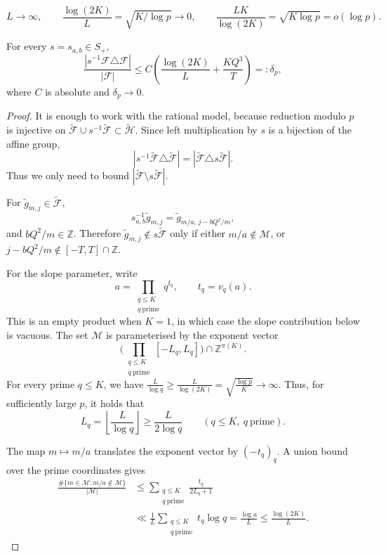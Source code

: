 \documentclass[10pt,a4paper]{amsart}
\newcommand{\Z}{\mathbb Z}
\begin{document}
\begin{equation}\label{eq:L-choice}
        L\to\infty,
        \qquad
        \frac{\log(2K)}{L}=\sqrt{K/\log p}\to0,
        \qquad
        \frac{LK}{\log(2K)}=\sqrt{K\log p}=o(\log p).
\end{equation}

\begin{lemma}\label{lem:Folner}
For every $s=s_{a,b}\in S_+$,
\[
        \frac{|s^{-1}\mathcal F\triangle\mathcal F|}{|\mathcal F|}
        \le C\left(\frac{\log(2K)}{L}+\frac{KQ^3}{T}\right)=: \delta_p,
\]
where $C$ is absolute and $\delta_p\to0$.
\end{lemma}

\begin{proof}
It is enough to work with the rational model, because reduction modulo $p$ is
injective on $\widetilde{\mathcal F}\cup s^{-1}\widetilde{\mathcal F}\subset
\widetilde{\mathcal H}$.  Since left multiplication by $s$ is a bijection of the
affine group,
\[
    |s^{-1}\widetilde{\mathcal F}\triangle\widetilde{\mathcal F}|
    =|\widetilde{\mathcal F}\triangle s\widetilde{\mathcal F}|.
\]
Thus we only need to bound $|\widetilde{\mathcal F}\setminus s\widetilde{\mathcal F}|$.

For $\widetilde g_{m,j}\in\widetilde{\mathcal F}$,
\[
    s_{a,b}^{-1}\widetilde g_{m,j}
    =\widetilde g_{m/a,\, j-bQ^2/m},
\]
and $bQ^2/m\in\Z$.  Therefore $\widetilde g_{m,j}\notin
s\widetilde{\mathcal F}$ only if either $m/a\notin\mathcal M$, or
$j-bQ^2/m\notin[-T,T]\cap\Z$.

For the slope parameter, write
\[
    a=\prod_{\substack{q\le K\\ q\ \mathrm{prime}}}q^{t_q},
    \qquad t_q=v_q(a).
\]
This is an empty product when \(K=1\), in which case the slope contribution
below is vacuous.  The set \(\mathcal M\) is parameterised by the exponent vector
\[
\Big(\prod_{\substack{q\le K\\ q\ \mathrm{prime}}}
    [-L_q,L_q]\Big)\cap\Z^{\pi(K)} .
\]
For every prime \(q\le K\), we have $ \frac{L}{\log q}\ge \frac{L}{\log(2K)}=\sqrt{\frac{\log p}{K}}\to\infty $. 
Thus, for sufficiently large \(p\), it holds that
\[ L_q=\left\lfloor\frac{L}{\log q}\right\rfloor
    \ge \frac{L}{2\log q}
    \qquad (q\le K,\ q\ \mathrm{prime}).
\]

The map \(m\mapsto m/a\) translates the exponent vector by \((-t_q)_q\).
A union bound over the prime coordinates gives
\[
\begin{aligned}
    \frac{\#\{m\in\mathcal M:m/a\notin\mathcal M\}}{|\mathcal M|}
    &\le \sum_{\substack{q\le K\\ q\ \mathrm{prime}}}
        \frac{t_q}{2L_q+1}  \\
    &\ll \frac1L
        \sum_{\substack{q\le K\\ q\ \mathrm{prime}}} t_q\log q
      = \frac{\log a}{L}
      \le \frac{\log(2K)}{L}.
\end{aligned}
\]


\end{proof}
\end{document}
